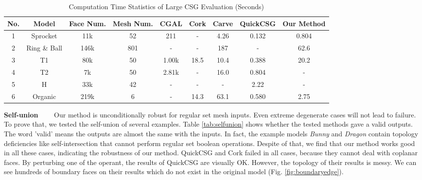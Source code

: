 \documentclass[10pt,journal,compsoc]{IEEEtran}
\begin{document}
\begin{table}[ht]
\caption{Computation Time Statistics of Large CSG Evaluation (Seconds)}
\label{tab:performance2}
\centering
\begin{tabular}{*{8}{c|}c}%
\hline
{No.} & {Model} & {Face Num.} & {Mesh Num.} &
CGAL  & Cork & Carve & QuickCSG & Our Method
\\
\hline\hline
1 & Sprocket & 11k & 52 & 211  & - & 4.26 & 0.132 & 0.804\\
2 & Ring \& Ball & 146k & 801 & -  & - & 187 & - & 62.6\\
3 & T1 & 80k & 50 & 1.00k & 18.5 & 10.4 & 0.388 & 20.2\\
4 & T2 & 7k & 50 & 2.81k & - & 16.0 & 0.804 & -\\
5 & H & 33k & 42 & - & - & - & 2.22 & -\\
6 & Organic & 219k & 6 & - & 14.3 & 63.1 & 0.580 & 2.75\\
\hline
\end{tabular}
\begin{flushleft}
\end{flushleft}
\end{table}



\vspace{0.5em}
\noindent\textbf{Self-union}~~~~
Our method is unconditionally robust for regular set mesh inputs. Even extreme degenerate cases will not lead to failure. To prove that, we tested the self-union of several examples. Table \ref{tab:selfunion} shows whether the tested methods gave a valid outputs. The word 'valid' means the outputs are almost the same with the inputs. In fact, the example models \emph{Bunny} and \emph{Dragon} contain topology deficiencies like self-intersection that cannot perform regular set boolean operations. Despite of that, we find that our method works good in all these cases, indicating the robustness of our method. QuickCSG and Cork failed in all cases, because they cannot deal with coplanar faces. By perturbing one of the operant, the results of QuickCSG are visually OK. However, the topology of their results is messy. We can see hundreds of boundary faces on their results which do not exist in the original model (Fig. \ref{fig:boundaryedge}).
\end{document}
